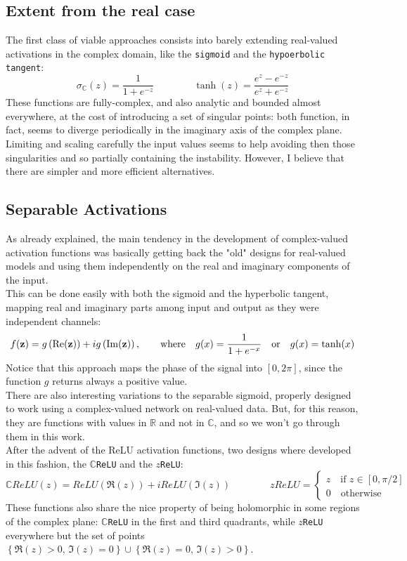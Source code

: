 \documentclass[../main.tex]{subfiles}
\begin{document}
\subsection*{Extent from the real case}
The first class of viable approaches consists into barely extending real-valued activations in the complex domain, like the \texttt{sigmoid} and the \texttt{hypoerbolic tangent}:
\[ \sigma_\mathds{C}(z) = \frac{1}{1+e^{-z}}  \qquad\qquad \tanh(z) = \frac{e^z - e^{-z}}{e^z + e^{-z}} \]
These functions are fully-complex, and also analytic and bounded almost everywhere, at the cost of introducing a set of singular points: both function, in fact, seems to diverge periodically in the imaginary axis of the complex plane. Limiting and scaling carefully the input values seems to help avoiding then those singularities and so partially containing the instability. However, I believe that there are simpler and more efficient alternatives.

\subsection*{Separable Activations}
As already explained, the main tendency in the development of complex-valued activation functions was basically getting back the "old" designs for real-valued models and using them independently on the real and imaginary components of the input.\\
This can be done easily with both the sigmoid and the hyperbolic tangent, mapping real and imaginary parts among input and output as they were independent channels:
\[ f(\vb{z}) = g\left(\Re(\vb{z})\right) + ig\left(\Im(\vb{z})\right), \qquad\text{where}\quad g(x) = \frac{1}{1+e^{-x}} \quad\text{or}\quad g(x)=\tanh(x) \]
Notice that this approach maps the phase of the signal into $[0,2\pi]$, since the function $g$ returns always a positive value.\\
There are also interesting variations to the separable sigmoid, properly designed to work using a complex-valued network on real-valued data. But, for this reason, they are functions with values in $\mathds{R}$ and not in $\mathds{C}$, and so we won't go through them in this work.\\
After the advent of the ReLU activation functions, two designs where developed in this fashion, the \texttt{$\mathds{C}$ReLU} and the \texttt{$z$ReLU}:
\[ \mathds{C}ReLU(z) = ReLU(\Re(z)) + iReLU(\Im(z)) \qquad\qquad zReLU = \begin{cases} z\quad \text{if } z\in[0,\pi/2] \\ 0\quad\text{otherwise} \end{cases} \]
These functions also share the nice property of being holomorphic in some regions of the complex plane: \texttt{$\mathds{C}$ReLU} in the first and third quadrants, while \texttt{$z$ReLU} everywhere but the set of points $\left\{\Re(z)>0,\, \Im(z)=0\right\} \cup \left\{\Re(z)=0,\, \Im(z)>0\right\}$.
\end{document}
